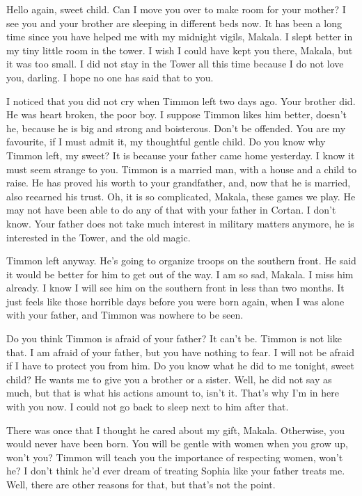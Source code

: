 \documentclass{article}
\begin{document}
Hello again, sweet child. Can I move you over to make room for your mother? I see you and your brother are sleeping in different beds now. It has been a long time since you have helped me with my midnight vigils, Makala. I slept better in my tiny little room in the tower. I wish I could have kept you there, Makala, but it was too small. I did not stay in the Tower all this time because I do not love you, darling. I hope no one has said that to you.

I noticed that you did not cry when Timmon left two days ago. Your brother did. He was heart broken, the poor boy. I suppose Timmon likes him better, doesn't he, because he is big and strong and boisterous. Don't be offended. You are my favourite, if I must admit it, my thoughtful gentle child. Do you know why Timmon left, my sweet? It is because your father came home yesterday. I know it must seem strange to you. Timmon is a married man, with a house and a child to raise. He has proved his worth to your grandfather, and, now that he is married, also reearned his trust. Oh, it is so complicated, Makala, these games we play. He may not have been able to do any of that with your father in Cortan. I don't know. Your father does not take much interest in military matters anymore, he is interested in the Tower, and the old magic.

Timmon left anyway. He's going to organize troops on the southern front. He said it would be better for him to get out of the way. I am so sad, Makala. I miss him already. I know I will see him on the southern front in less than two months. It just feels like those horrible days before you were born again, when I was alone with your father, and Timmon was nowhere to be seen.

Do you think Timmon is afraid of your father? It can't be. Timmon is not like that. I am afraid of your father, but you have nothing to fear. I will not be afraid if I have to protect you from him. Do you know what he did to me tonight, sweet child? He wants me to give you a brother or a sister. Well, he did not say as much, but that is what his actions amount to, isn't it. That's why I'm in here with you now. I could not go back to sleep next to him after that. 

There was once that I thought he cared about my gift, Makala. Otherwise, you would never have been born. You will be gentle with women when you grow up, won't you? Timmon will teach you the importance of respecting women, won't he? I don't think he'd ever dream of treating Sophia like your father treats me. Well, there are other reasons for that, but that's not the point. 
\end{document}
